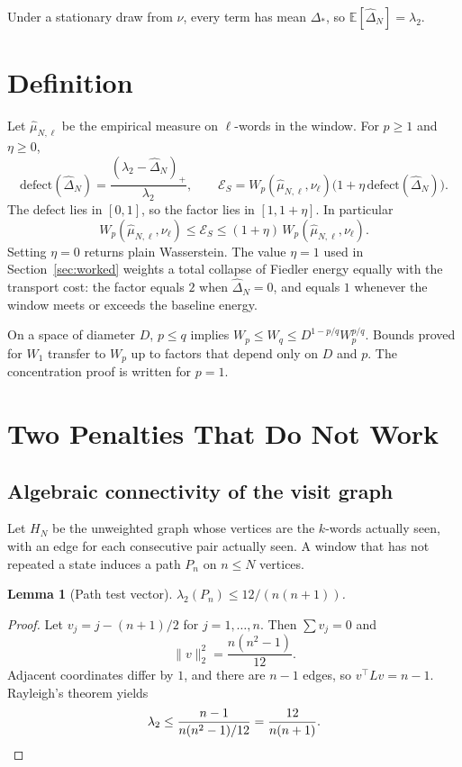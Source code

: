 \documentclass[11pt,reqno]{amsart}
\newtheorem{lemma}[theorem]{Lemma}
\theoremstyle{remark}
\newcommand{\ES}{\mathcal{E}_S}
\newcommand{\defect}{\mathrm{defect}}
\begin{document}
Under a stationary draw from $\nu$, every term has mean $\Delta_*$, so $\mathbb{E}[\hat\Delta_N] = \lambda_2$.

\section{Definition}\label{sec:def}

Let $\hat\mu_{N,\ell}$ be the empirical measure on $\ell$-words in the window. For $p \ge 1$ and $\eta \ge 0$,
\[
\defect(\hat\Delta_N)
=
\frac{(\lambda_2 - \hat\Delta_N)_+}{\lambda_2},
\qquad
\ES
=
W_p(\hat\mu_{N,\ell}, \nu_\ell)
\bigl(1 + \eta \,\defect(\hat\Delta_N)\bigr).
\]
The defect lies in $[0,1]$, so the factor lies in $[1, 1+\eta]$. In particular
\[
W_p(\hat\mu_{N,\ell}, \nu_\ell)
\le
\ES
\le
(1+\eta)\, W_p(\hat\mu_{N,\ell}, \nu_\ell).
\]
Setting $\eta = 0$ returns plain Wasserstein. The value $\eta = 1$ used in Section~\ref{sec:worked} weights a total collapse of Fiedler energy equally with the transport cost: the factor equals $2$ when $\hat\Delta_N = 0$, and equals $1$ whenever the window meets or exceeds the baseline energy.

On a space of diameter $D$, $p \le q$ implies $W_p \le W_q \le D^{1-p/q} W_p^{p/q}$. Bounds proved for $W_1$ transfer to $W_p$ up to factors that depend only on $D$ and $p$. The concentration proof is written for $p = 1$.

\section{Two Penalties That Do Not Work}\label{sec:bad-penalties}

\subsection{Algebraic connectivity of the visit graph}

Let $H_N$ be the unweighted graph whose vertices are the $k$-words actually seen, with an edge for each consecutive pair actually seen. A window that has not repeated a state induces a path $P_n$ on $n \le N$ vertices.

\begin{lemma}[Path test vector]
$\lambda_2(P_n) \le 12/(n(n+1))$.
\end{lemma}
\begin{proof}
Let $v_j = j - (n+1)/2$ for $j = 1,\ldots,n$. Then $\sum v_j = 0$ and
\[
\|v\|_2^2 = \frac{n(n^2-1)}{12}.
\]
Adjacent coordinates differ by $1$, and there are $n-1$ edges, so $v^\top L v = n-1$. Rayleigh's theorem yields
\[
\lambda_2 \le \frac{n-1}{n(n^2-1)/12} = \frac{12}{n(n+1)}.\qedhere
\]
\end{proof}
\end{document}
